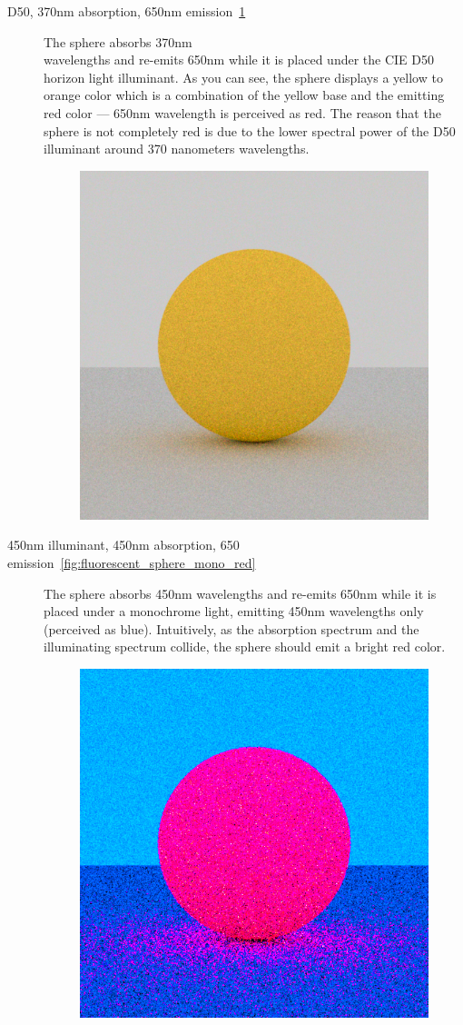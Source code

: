 \begin{description}
	\item[D50, 370nm absorption, 650nm emission~\ref{fig:fluorescence_d50_red}] The sphere absorbs 370nm \\wavelengths and re-emits 650nm while it is placed under the CIE D50 horizon light illuminant. As you can see, the sphere displays a yellow to orange color which is a combination of the yellow base and the emitting red color --- 650nm wavelength is perceived as red. The reason that the sphere is not completely red is due to the lower spectral power of the D50 illuminant around 370 nanometers wavelengths.
	\begin{figure}[H]
		\centering
		\includegraphics[width=.6\linewidth]{img/fluorescent_sphere_D50_red.png}
		\caption{}
		\label{fig:fluorescence_d50_red}
	\end{figure}
	\item[450nm illuminant, 450nm absorption, 650 emission~\ref{fig:fluorescent_sphere_mono_red}] The sphere absorbs 450nm wavelengths and re-emits 650nm while it is placed under a monochrome light, emitting 450nm wavelengths only (perceived as blue). Intuitively, as the absorption spectrum and the illuminating spectrum collide, the sphere should emit a bright red color.
	\begin{figure}[H]
		\centering
		\includegraphics[width=.6\linewidth]{img/fluorescent_sphere_mono_red.png}

\end{figure}
\end{description}

